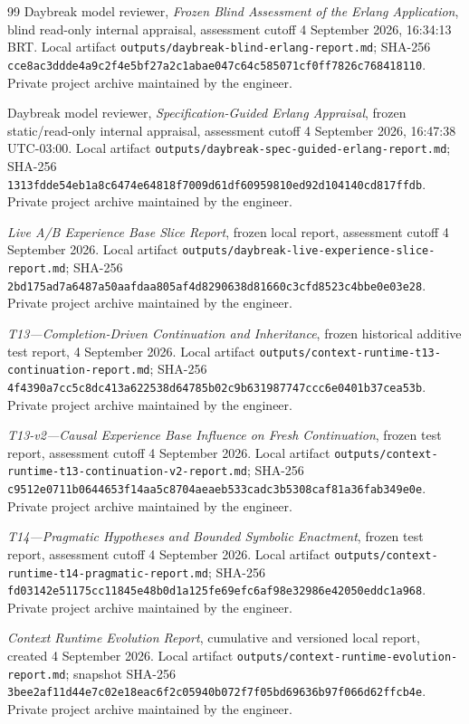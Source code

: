 \documentclass[10pt,a4paper]{article}
\begin{document}
\begin{thebibliography}{99}
Daybreak model reviewer, \emph{Frozen Blind Assessment of the Erlang Application}, blind read-only internal appraisal, assessment cutoff 4 September 2026, 16:34:13 BRT. Local artifact \nolinkurl{outputs/daybreak-blind-erlang-report.md}; SHA-256 \nolinkurl{cce8ac3ddde4a9c2f4e5bf27a2c1abae047c64c585071cf0ff7826c768418110}. Private project archive maintained by the engineer.

Daybreak model reviewer, \emph{Specification-Guided Erlang Appraisal}, frozen static/read-only internal appraisal, assessment cutoff 4 September 2026, 16:47:38 UTC-03:00. Local artifact \nolinkurl{outputs/daybreak-spec-guided-erlang-report.md}; SHA-256 \nolinkurl{1313fdde54eb1a8c6474e64818f7009d61df60959810ed92d104140cd817ffdb}. Private project archive maintained by the engineer.

\emph{Live A/B Experience Base Slice Report}, frozen local report, assessment cutoff 4 September 2026. Local artifact \nolinkurl{outputs/daybreak-live-experience-slice-report.md}; SHA-256 \nolinkurl{2bd175ad7a6487a50aafdaa805af4d8290638d81660c3cfd8523c4bbe0e03e28}. Private project archive maintained by the engineer.

\emph{T13---Completion-Driven Continuation and Inheritance}, frozen historical additive test report, 4 September 2026. Local artifact \nolinkurl{outputs/context-runtime-t13-continuation-report.md}; SHA-256 \nolinkurl{4f4390a7cc5c8dc413a622538d64785b02c9b631987747ccc6e0401b37cea53b}. Private project archive maintained by the engineer.

\emph{T13-v2---Causal Experience Base Influence on Fresh Continuation}, frozen test report, assessment cutoff 4 September 2026. Local artifact \nolinkurl{outputs/context-runtime-t13-continuation-v2-report.md}; SHA-256 \nolinkurl{c9512e0711b0644653f14aa5c8704aeaeb533cadc3b5308caf81a36fab349e0e}. Private project archive maintained by the engineer.

\emph{T14---Pragmatic Hypotheses and Bounded Symbolic Enactment}, frozen test report, assessment cutoff 4 September 2026. Local artifact \nolinkurl{outputs/context-runtime-t14-pragmatic-report.md}; SHA-256 \nolinkurl{fd03142e51175cc11845e48b0d1a125fe69efc6af98e32986e42050eddc1a968}. Private project archive maintained by the engineer.

\emph{Context Runtime Evolution Report}, cumulative and versioned local report, created 4 September 2026. Local artifact \nolinkurl{outputs/context-runtime-evolution-report.md}; snapshot SHA-256 \nolinkurl{3bee2af11d44e7c02e18eac6f2c05940b072f7f05bd69636b97f066d62ffcb4e}. Private project archive maintained by the engineer.


\end{thebibliography}
\end{document}

